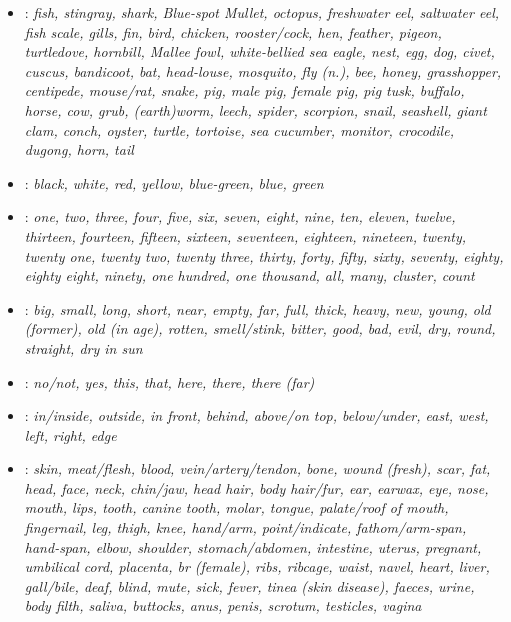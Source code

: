 \begin{itemize}
\item	{}: 
\it{fish},
\it{stingray},
shark,
Blue-spot Mullet,
octopus,
freshwater eel,
saltwater eel,
fish scale,
gills,
fin,
\it{bird},
chicken,
rooster/cock,
hen,
feather,
pigeon,
turtledove,
\it{hornbill},
Mallee fowl,
white-bellied sea eagle,
nest,
\it{egg},
\it{dog},
\it{civet},
\it{cuscus},
\it{bandicoot},
\it{bat},
\it{head-louse},
\it{mosquito},
\it{fly (n.)},
\it{bee},
honey,
grasshopper,
centipede,
\it{mouse/rat},
\it{snake},
\it{pig},
male pig,
female pig,
pig tusk,
buffalo,
\it{horse},
\it{cow},
\it{grub},
(earth)worm,
leech,
\it{spider},
\it{scorpion},
snail,
seashell,
giant clam,
conch,
oyster,
\it{turtle},
\it{tortoise},
\it{sea cucumber},
\it{monitor},
\it{crocodile},
\it{dugong},
\it{horn},
\it{tail}

\item	{}:
\it{black},
\it{white},
\it{red},
\it{yellow},
blue-green,
\it{blue},
\it{green}

\item	{}: 
\it{one},
\it{two},
\it{three},
\it{four},
\it{five},
\it{six},
\it{seven},
\it{eight},
\it{nine},
\it{ten},
eleven,
twelve,
thirteen,
fourteen,
fifteen,
sixteen,
seventeen,
eighteen,
nineteen,
\it{twenty},
twenty one,
twenty two,
twenty three,
thirty,
forty,
fifty,
sixty,
seventy,
eighty,
eighty eight,
ninety,
\it{one hundred},
\it{one thousand},
\it{all},
\it{many},
cluster,
count

\item	{}: \it{big},
\it{small},
\it{long},
\it{short},
near,
empty,
\it{far},
\it{full},
\it{thick},
\it{heavy},
\it{new},
\it{young},
\it{old (former)},
\it{old (in age)},
\it{rotten},
\it{smell/stink},
\it{bitter},
good,
bad,
\it{evil},
\it{dry},
\it{round},
\it{straight},
\it{dry in sun}

\item	{}: \it{no/not},
yes,
\it{this},
\it{that},
\it{here},
\it{there},
\it{there (far)}

\item	{}: 
\it{in/inside},
\it{outside},
\it{in front},
\it{behind},
\it{above/on top},
\it{below/under},
\it{east},
\it{west},
left,
right,
\it{edge}

\item	{}: 
\it{skin},
\it{meat/flesh},
\it{blood},
\it{vein/artery/tendon},
\it{bone},
wound (fresh),
scar,
fat,
\it{head},
\it{face},
\it{neck},
\it{chin/jaw},
\it{head hair},
\it{body hair/fur},
\it{ear},
earwax,
\it{eye},
\it{nose},
\it{mouth},
\it{lips},
\it{tooth},
canine tooth,
molar,
\it{tongue},
\it{palate/roof of mouth},
\it{fingernail},
\it{leg},
\it{thigh},
\it{knee},
\it{hand/arm},
\it{point/indicate},
\it{fathom/arm-span},
\it{hand-span},
\it{elbow},
\it{shoulder},
\it{stomach/abdomen},
intestine,
uterus,
\it{pregnant},
umbilical cord,
placenta,
\it{br (female)},
\it{ribs},
ribcage,
\it{waist},
\it{navel},
\it{heart},
\it{liver},
\it{gall/bile},
\it{deaf},
\it{blind},
mute,
\it{sick},
fever,
\it{tinea (skin disease)},
\it{faeces},
\it{urine},
\it{body filth},
\it{saliva},
buttocks,
anus,
penis,
scrotum,
testicles,
vagina


\end{itemize}
